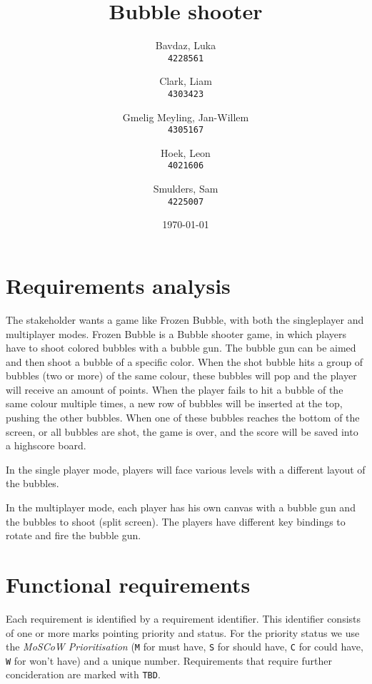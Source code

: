 \documentclass[a4paper]{article}
\title{Bubble shooter}
\author{
    Bavdaz, Luka\\
    \texttt{4228561}
    \and
    Clark, Liam\\
    \texttt{4303423}
    \and
    Gmelig Meyling, Jan-Willem\\
    \texttt{4305167}
    \and
    Hoek, Leon\\
    \texttt{4021606}
    \and
    Smulders, Sam\\
    \texttt{4225007}
}
\date{\today}
\begin{document}
\maketitle



\section{Requirements analysis}
The stakeholder wants a game like Frozen Bubble, with both the singleplayer and multiplayer modes. Frozen Bubble is a Bubble shooter game, in which players have to shoot colored bubbles with a bubble gun. The bubble gun can be aimed and then shoot a bubble of a specific color. When the shot bubble hits a group of bubbles (two or more) of the same colour, these bubbles will pop and the player will receive an amount of points. When the player fails to hit a bubble of the same colour multiple times, a new row of bubbles will be inserted at the top, pushing the other bubbles. When one of these bubbles reaches the bottom of the screen, or all bubbles are shot, the game is over, and the score will be saved into a highscore board.
\par In the single player mode, players will face various levels with a different layout of the bubbles.
\par In the multiplayer mode, each player has his own canvas with a bubble gun and the bubbles to shoot (split screen). The players have different key bindings to rotate and fire the bubble gun.

\section{Functional requirements}
Each requirement is identified by a requirement identifier. This identifier consists of one or more marks pointing priority and status. For the priority status we use the \textit{MoSCoW Prioritisation} \citep{moscow} (\texttt{M} for must have, \texttt{S} for should have, \texttt{C} for could have, \texttt{W} for won't have) and a unique number. Requirements that require further concideration are marked with \texttt{TBD}.
\end{document}
